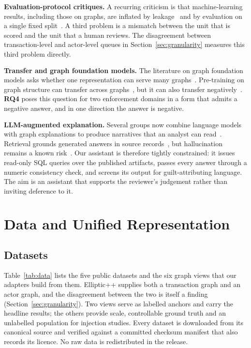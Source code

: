 \documentclass[conference]{IEEEtran}
\newcommand{\RQ}[1]{\textbf{RQ#1}}
\begin{document}
\textbf{Evaluation-protocol critiques.} A recurring criticism is that
machine-learning results, including those on graphs, are inflated by
leakage~\cite{kaufman2012,kapoor2023} and by evaluation on a single fixed
split~\cite{shchur2018}. A third problem is a mismatch between the unit that is
scored and the unit that a human reviews. The disagreement between
transaction-level and actor-level queues in Section~\ref{sec:granularity}
measures this third problem directly.

\textbf{Transfer and graph foundation models.} The literature on graph
foundation models asks whether one representation can serve many
graphs~\cite{liu2025gfm,mao2024}. Pre-training on graph structure can transfer
across graphs~\cite{qiu2020gcc}, but it can also transfer
negatively~\cite{hu2020}. \RQ{4} poses this question for two enforcement
domains in a form that admits a negative answer, and in one direction the
answer is negative.

\textbf{LLM-augmented explanation.} Several groups now combine language models
with graph explanations to produce narratives that an analyst can
read~\cite{cedro2026}. Retrieval grounds generated answers in source
records~\cite{lewis2020}, but hallucination remains a known risk~\cite{ji2023}.
Our assistant is therefore tightly constrained: it issues read-only SQL queries
over the published artifacts, passes every answer through a numeric consistency
check, and screens its output for guilt-attributing language. The aim is an
assistant that supports the reviewer's judgement rather than inviting deference
to it.

\section{Data and Unified Representation}

\subsection{Datasets}

Table~\ref{tab:data} lists the five public datasets and the six graph views that
our adapters build from them. Elliptic++ supplies both a transaction graph and
an actor graph, and the disagreement between the two is itself a finding
(Section~\ref{sec:granularity}). Two views serve as labelled anchors and carry
the headline results; the others provide scale, controllable ground truth and
an unlabelled population for injection studies. Every dataset is downloaded
from its canonical source and verified against a committed checksum manifest
that also records its licence. No raw data is redistributed in the release.
\end{document}
